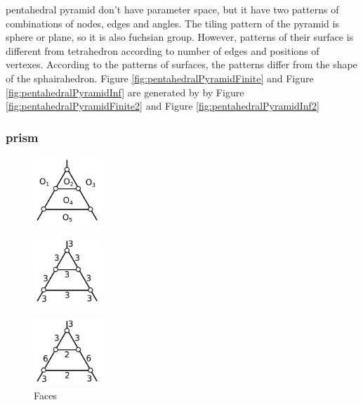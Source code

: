 \documentclass[dvipdfmx]{interact}
\theoremstyle{plain}%
\theoremstyle{definition}
\theoremstyle{remark}
\theoremstyle{problemstyle}
\begin{document}
pentahedral pyramid don't have parameter space, but it have two patterns
of combinations of nodes, edges and angles.
The tiling pattern of the pyramid is sphere or plane, so it is also fuchsian group.
However, patterns of their surface is
different from tetrahedron according to number of edges and positions of
vertexes.
According to the patterns of surfaces, the patterns differ from the
shape of the sphairahedron.
Figure \ref{fig:pentahedralPyramidFinite} and Figure
\ref{fig:pentahedralPyramidInf} are generated by by 
Figure \ref{fig:pentahedralPyramidFinite2} and
Figure \ref{fig:pentahedralPyramidInf2}
\subsubsection{prism}

\begin{figure}[h!tbp]
  \begin{minipage}[t]{0.23\textwidth}
   \centering
   \includegraphics[width=1in, keepaspectratio]{./img/HexahedraWithSphericalFaces/pentahedralPrism/pentahedralPrismFaces.png}
   \caption{Faces}
   \label{fig:}
  \end{minipage}
 \hspace*{\fill}
 \begin{minipage}[t]{0.69\textwidth}
  \begin{minipage}[t]{0.23\textwidth}
   \centering
   \includegraphics[width=1in,
   keepaspectratio]{./img/HexahedraWithSphericalFaces/pentahedralPrism/pentahedralPrism_a.png}
   \subcaption{}
   \label{fig:}
  \end{minipage}
  \hspace*{\fill}
  \begin{minipage}[t]{0.23\textwidth}
   \centering
   \includegraphics[width=1in, keepaspectratio]{./img/HexahedraWithSphericalFaces/pentahedralPrism/pentahedralPrism_b.png}

\end{minipage}
\end{minipage}
\end{figure}
\end{document}
